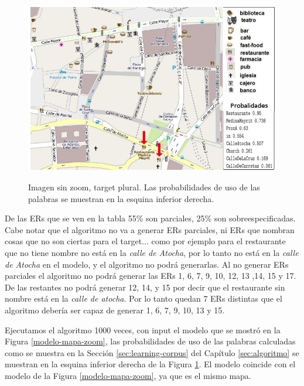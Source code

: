 \begin{figure}[H]
\centering
\includegraphics[width=\textwidth]{images/corpus/mapa10conProb.png}\\[0pt]
\caption{Imagen sin zoom, target plural. Las probabilidades de uso de las palabras se muestran en la esquina inferior derecha.}
\label{mapa-zoom-plural}
\end{figure}

De las ERs que se ven en la tabla 55\% son parciales, 25\% son sobreespecificadas. Cabe notar que el algoritmo no va a generar ERs parciales, ni ERs que nombran cosas que no son ciertas para el target... como por ejemplo para el restaurante que no tiene nombre no est\'a en la {\it calle de Atocha}, por lo tanto no est\'a en la {\it calle de Atocha} en el modelo, y el algoritmo no podr\'a generarlas. Al no generar ERs parciales el algoritmo no podr\'a generar las ERs 1, 6, 7, 9, 10, 12, 13 ,14, 15 y 17. De las restantes no podr\'a generar 12, 14, y 15 por decir que el restaurante sin nombre est\'a en la {\it calle de atocha}. Por lo tanto quedan 7 ERs distintas que el algoritmo deber\'ia ser capaz de generar 1, 6, 7, 9, 10, 13 y 15. %

Ejecutamos el algoritmo 1000 veces, con input el modelo que se mostr\'o en la Figura \ref{modelo-mapa-zoom}, las probabilidades de uso de las palabras calculadas como se muestra en la Secci\'on \ref{sec:learning-corpus} del Cap\'itulo \ref{sec:algoritmo} se muestran en la esquina inferior derecha de la Figura \ref{mapa-zoom-plural}. El modelo coincide con el modelo de la Figura \ref{modelo-mapa-zoom}, ya que es el mismo mapa.



